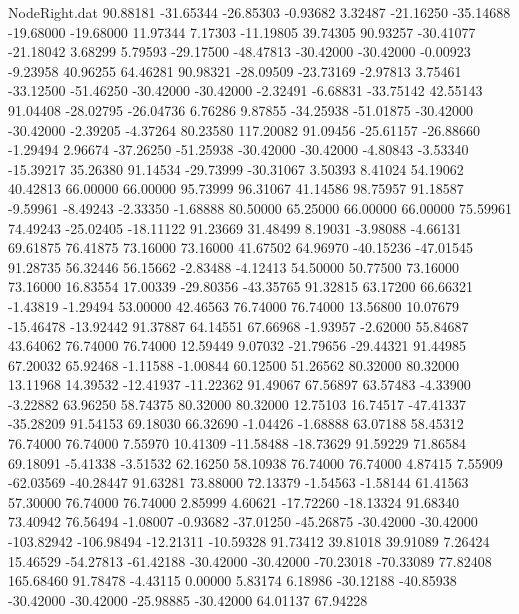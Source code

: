 \begin{filecontents}{NodeRight.dat}
  90.88181  -31.65344  -26.85303    -0.93682    3.32487  -21.16250  -35.14688  -19.68000  -19.68000   11.97344    7.17303  -11.19805   39.74305
  90.93257  -30.41077  -21.18042     3.68299    5.79593  -29.17500  -48.47813  -30.42000  -30.42000   -0.00923   -9.23958   40.96255   64.46281
  90.98321  -28.09509  -23.73169    -2.97813    3.75461  -33.12500  -51.46250  -30.42000  -30.42000   -2.32491   -6.68831  -33.75142   42.55143
  91.04408  -28.02795  -26.04736     6.76286    9.87855  -34.25938  -51.01875  -30.42000  -30.42000   -2.39205   -4.37264   80.23580  117.20082
  91.09456  -25.61157  -26.88660    -1.29494    2.96674  -37.26250  -51.25938  -30.42000  -30.42000   -4.80843   -3.53340  -15.39217   35.26380
  91.14534  -29.73999  -30.31067     3.50393    8.41024   54.19062   40.42813   66.00000   66.00000   95.73999   96.31067   41.14586   98.75957
  91.18587   -9.59961   -8.49243    -2.33350   -1.68888   80.50000   65.25000   66.00000   66.00000   75.59961   74.49243  -25.02405  -18.11122
  91.23669   31.48499    8.19031    -3.98088   -4.66131   69.61875   76.41875   73.16000   73.16000   41.67502   64.96970  -40.15236  -47.01545
  91.28735   56.32446   56.15662    -2.83488   -4.12413   54.50000   50.77500   73.16000   73.16000   16.83554   17.00339  -29.80356  -43.35765
  91.32815   63.17200   66.66321    -1.43819   -1.29494   53.00000   42.46563   76.74000   76.74000   13.56800   10.07679  -15.46478  -13.92442
  91.37887   64.14551   67.66968    -1.93957   -2.62000   55.84687   43.64062   76.74000   76.74000   12.59449    9.07032  -21.79656  -29.44321
  91.44985   67.20032   65.92468    -1.11588   -1.00844   60.12500   51.26562   80.32000   80.32000   13.11968   14.39532  -12.41937  -11.22362
  91.49067   67.56897   63.57483    -4.33900   -3.22882   63.96250   58.74375   80.32000   80.32000   12.75103   16.74517  -47.41337  -35.28209
  91.54153   69.18030   66.32690    -1.04426   -1.68888   63.07188   58.45312   76.74000   76.74000    7.55970   10.41309  -11.58488  -18.73629
  91.59229   71.86584   69.18091    -5.41338   -3.51532   62.16250   58.10938   76.74000   76.74000    4.87415    7.55909  -62.03569  -40.28447
  91.63281   73.88000   72.13379    -1.54563   -1.58144   61.41563   57.30000   76.74000   76.74000    2.85999    4.60621  -17.72260  -18.13324
  91.68340   73.40942   76.56494    -1.08007   -0.93682  -37.01250  -45.26875  -30.42000  -30.42000 -103.82942 -106.98494  -12.21311  -10.59328
  91.73412   39.81018   39.91089     7.26424   15.46529  -54.27813  -61.42188  -30.42000  -30.42000  -70.23018  -70.33089   77.82408  165.68460
  91.78478   -4.43115    0.00000     5.83174    6.18986  -30.12188  -40.85938  -30.42000  -30.42000  -25.98885  -30.42000   64.01137   67.94228

\end{filecontents}
